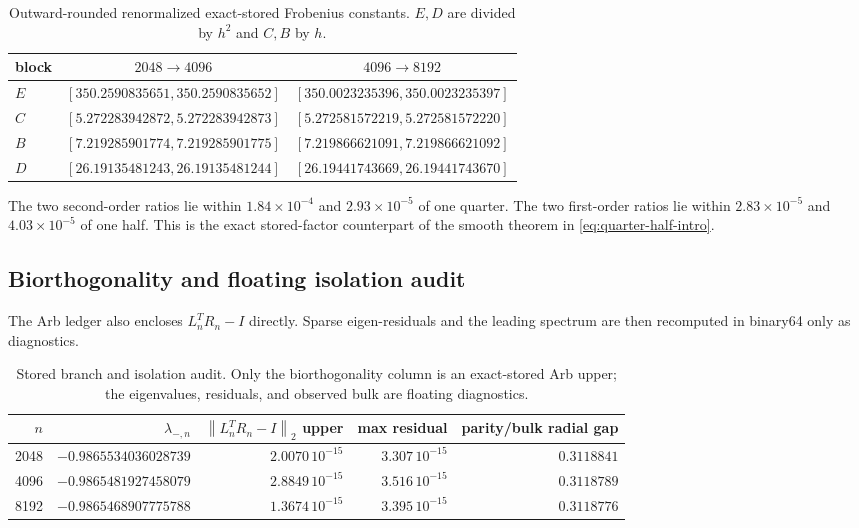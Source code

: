 \documentclass[11pt]{article}
\theoremstyle{definition}
\theoremstyle{remark}
\newcommand{\norm}[1]{\left\lVert #1\right\rVert}
\begin{document}
\begin{table}[H]
\centering
\small
\caption{Outward-rounded renormalized exact-stored Frobenius constants.
$E,D$ are divided by $h^2$ and $C,B$ by $h$.}
\label{tab:renormalized}
\begin{tabular}{lcc}
\toprule
block & $2048\to4096$ & $4096\to8192$\\
\midrule
$E$ & $[350.2590835651,350.2590835652]$
    & $[350.0023235396,350.0023235397]$\\
$C$ & $[5.272283942872,5.272283942873]$
    & $[5.272581572219,5.272581572220]$\\
$B$ & $[7.219285901774,7.219285901775]$
    & $[7.219866621091,7.219866621092]$\\
$D$ & $[26.19135481243,26.19135481244]$
    & $[26.19441743669,26.19441743670]$\\
\bottomrule
\end{tabular}
\end{table}

The two second-order ratios lie within $1.84\times10^{-4}$ and
$2.93\times10^{-5}$ of one quarter.  The two first-order ratios lie within
$2.83\times10^{-5}$ and $4.03\times10^{-5}$ of one half.  This is the exact
stored-factor counterpart of the smooth theorem in
\eqref{eq:quarter-half-intro}.

\subsection{Biorthogonality and floating isolation audit}

The Arb ledger also encloses $L_n^TR_n-I$ directly.  Sparse eigen-residuals
and the leading spectrum are then recomputed in binary64 only as diagnostics.

\begin{table}[H]
\centering
\caption{Stored branch and isolation audit.  Only the biorthogonality column
is an exact-stored Arb upper; the eigenvalues, residuals, and observed bulk
are floating diagnostics.}
\label{tab:isolation}
\begin{tabular}{rrrrr}
\toprule
$n$ & $\lambda_{-,n}$ & $\norm{L_n^TR_n-I}_2$ upper
& max residual & parity/bulk radial gap\\
\midrule
2048 & $-0.9865534036028739$ & $2.0070\,10^{-15}$
     & $3.307\,10^{-15}$ & $0.3118841$\\
4096 & $-0.9865481927458079$ & $2.8849\,10^{-15}$
     & $3.516\,10^{-15}$ & $0.3118789$\\
8192 & $-0.9865468907775788$ & $1.3674\,10^{-15}$
     & $3.395\,10^{-15}$ & $0.3118776$\\
\bottomrule
\end{tabular}
\end{table}
\end{document}
